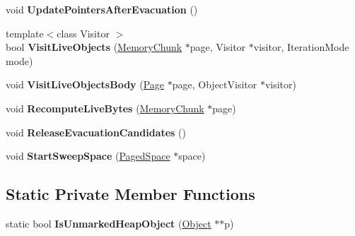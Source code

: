 \begin{DoxyCompactItemize}
\item 
void {\bfseries Update\+Pointers\+After\+Evacuation} ()\hypertarget{classv8_1_1internal_1_1_mark_compact_collector_a10156273473177e162f6a5cb30b1b7e8}{}\label{classv8_1_1internal_1_1_mark_compact_collector_a10156273473177e162f6a5cb30b1b7e8}

\item 
{\footnotesize template$<$class Visitor $>$ }\\bool {\bfseries Visit\+Live\+Objects} (\hyperlink{classv8_1_1internal_1_1_memory_chunk}{Memory\+Chunk} $\ast$page, Visitor $\ast$visitor, Iteration\+Mode mode)\hypertarget{classv8_1_1internal_1_1_mark_compact_collector_aeff2364a84ed130668f90b418d5f5470}{}\label{classv8_1_1internal_1_1_mark_compact_collector_aeff2364a84ed130668f90b418d5f5470}

\item 
void {\bfseries Visit\+Live\+Objects\+Body} (\hyperlink{classv8_1_1internal_1_1_page}{Page} $\ast$page, Object\+Visitor $\ast$visitor)\hypertarget{classv8_1_1internal_1_1_mark_compact_collector_aa23946560586a9c516f38cacc7812556}{}\label{classv8_1_1internal_1_1_mark_compact_collector_aa23946560586a9c516f38cacc7812556}

\item 
void {\bfseries Recompute\+Live\+Bytes} (\hyperlink{classv8_1_1internal_1_1_memory_chunk}{Memory\+Chunk} $\ast$page)\hypertarget{classv8_1_1internal_1_1_mark_compact_collector_a93d4119f79014338146c15b4b298998e}{}\label{classv8_1_1internal_1_1_mark_compact_collector_a93d4119f79014338146c15b4b298998e}

\item 
void {\bfseries Release\+Evacuation\+Candidates} ()\hypertarget{classv8_1_1internal_1_1_mark_compact_collector_ae07545bc19d80a27a63c760d875601c2}{}\label{classv8_1_1internal_1_1_mark_compact_collector_ae07545bc19d80a27a63c760d875601c2}

\item 
void {\bfseries Start\+Sweep\+Space} (\hyperlink{classv8_1_1internal_1_1_paged_space}{Paged\+Space} $\ast$space)\hypertarget{classv8_1_1internal_1_1_mark_compact_collector_a4dc475c535877a5a4773b74c0a06c78a}{}\label{classv8_1_1internal_1_1_mark_compact_collector_a4dc475c535877a5a4773b74c0a06c78a}

\end{DoxyCompactItemize}
\subsection*{Static Private Member Functions}
\begin{DoxyCompactItemize}
\item 
static bool {\bfseries Is\+Unmarked\+Heap\+Object} (\hyperlink{classv8_1_1internal_1_1_object}{Object} $\ast$$\ast$p)\hypertarget{classv8_1_1internal_1_1_mark_compact_collector_af4a403b4db888db9ad3cd1bf8af91ae3}{}\label{classv8_1_1internal_1_1_mark_compact_collector_af4a403b4db888db9ad3cd1bf8af91ae3}

\end{DoxyCompactItemize}
